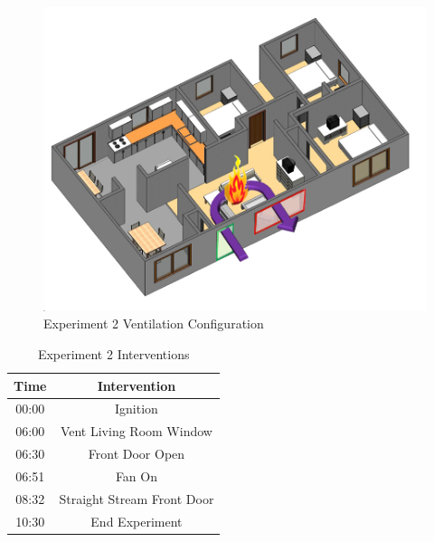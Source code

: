 \documentclass{article}
\begin{document}
 \begin{figure}[h!]
 	\centering
 	\includegraphics[width=5in]{0_Images/FireExperiments/Single_Story/Experiment_2.jpg}
 	\caption{Experiment 2 Ventilation Configuration}
 	\label{fig:Exp2VentConfig}
 \end{figure}

\begin{table}[H]
	\centering
	\caption{Experiment 2 Interventions}
	\begin{tabular}{|c|c|} 
		\hline
		Time & Intervention \\ \hline \hline
		00:00 & Ignition \\ \hline
		06:00 & Vent Living Room Window\\ \hline
		06:30 & Front Door Open \\ \hline
		06:51 & Fan On \\ \hline
		08:32 & Straight Stream Front Door \\ \hline
		10:30 & End Experiment \\ \hline
	\end{tabular}
	\label{Table:Exp2Interventions}
\end{table}
\end{document}
